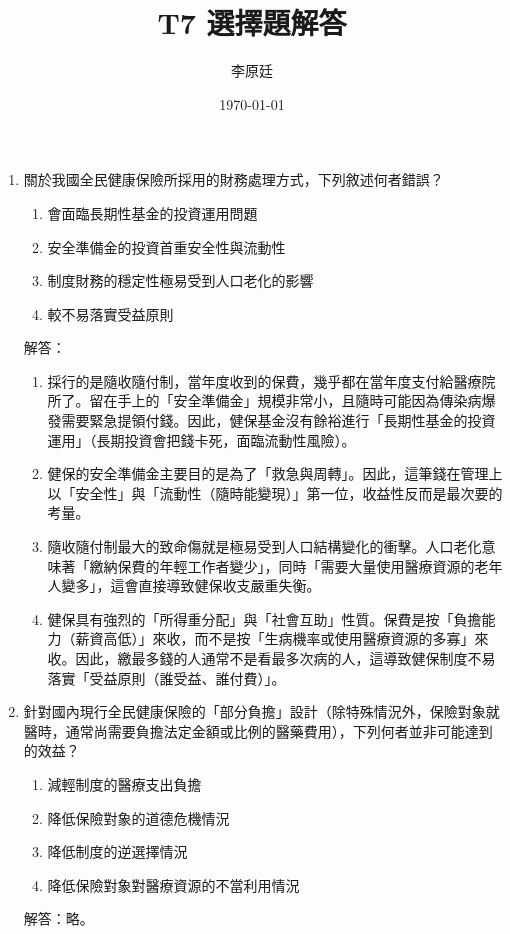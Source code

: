 \documentclass[12pt, a4paper]{article}
\begin{document}
\title{T7 選擇題解答} %
\author{李原廷} %
\date{\today} %

\maketitle



\begin{enumerate}

    \item 關於我國全民健康保險所採用的財務處理方式，下列敘述何者錯誤？
    \begin{enumerate}[label=\Alph*.]
        \item 會面臨長期性基金的投資運用問題
        \item 安全準備金的投資首重安全性與流動性
        \item 制度財務的穩定性極易受到人口老化的影響
        \item 較不易落實受益原則
    \end{enumerate}
    解答：
    \begin{enumerate}[label=\Alph*.]
        \item 採行的是隨收隨付制，當年度收到的保費，幾乎都在當年度支付給醫療院所了。留在手上的「安全準備金」規模非常小，且隨時可能因為傳染病爆發需要緊急提領付錢。因此，健保基金沒有餘裕進行「長期性基金的投資運用」（長期投資會把錢卡死，面臨流動性風險）。
        \item 健保的安全準備金主要目的是為了「救急與周轉」。因此，這筆錢在管理上以「安全性」與「流動性（隨時能變現）」第一位，收益性反而是最次要的考量。
        \item 隨收隨付制最大的致命傷就是極易受到人口結構變化的衝擊。人口老化意味著「繳納保費的年輕工作者變少」，同時「需要大量使用醫療資源的老年人變多」，這會直接導致健保收支嚴重失衡。
        \item 健保具有強烈的「所得重分配」與「社會互助」性質。保費是按「負擔能力（薪資高低）」來收，而不是按「生病機率或使用醫療資源的多寡」來收。因此，繳最多錢的人通常不是看最多次病的人，這導致健保制度不易落實「受益原則（誰受益、誰付費）」。
    \end{enumerate}

    \item 針對國內現行全民健康保險的「部分負擔」設計（除特殊情況外，保險對象就醫時，通常尚需要負擔法定金額或比例的醫藥費用），下列何者並非可能達到的效益？
    \begin{enumerate}[label=\Alph*.]
        \item 減輕制度的醫療支出負擔
        \item 降低保險對象的道德危機情況
        \item 降低制度的逆選擇情況
        \item 降低保險對象對醫療資源的不當利用情況
    \end{enumerate}
    解答：略。


\end{enumerate}
\end{document}
